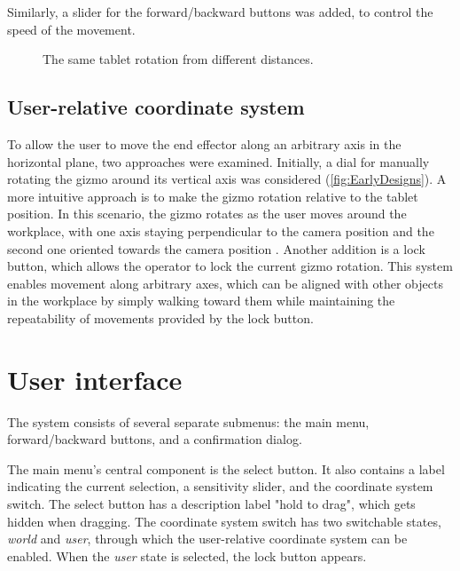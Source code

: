Similarly, a slider for the forward/backward buttons was added, to control the speed of the movement. 

\begin{figure}
    \centering
    \subfloat{
        
        \label{close}
    }
    \qquad
    \subfloat{
        
        \label{far}
    }
    
    \caption{The same tablet rotation from different distances.}
    \label{fig:closefar}
\end{figure}

\subsection{User-relative coordinate system}

To allow the user to move the end effector along an arbitrary axis in the horizontal plane, two approaches were examined. Initially, a dial for manually rotating the gizmo around its vertical axis was considered (\ref{fig:EarlyDesigns}). A more intuitive approach is to make the gizmo rotation relative to the tablet position. In this scenario, the gizmo rotates as the user moves around the workplace, with one axis staying perpendicular to the camera position and the second one oriented towards the camera position . Another addition is a lock button, which allows the operator to lock the current gizmo rotation. This system enables movement along arbitrary axes, which can be aligned with other objects in the workplace by simply walking toward them while maintaining the repeatability of movements provided by the lock button. 

\section{User interface}
The system consists of several separate submenus: the main menu, forward/backward buttons, and a confirmation dialog.

The main menu's central component is the select button. It also contains a label indicating the current selection, a sensitivity slider, and the coordinate system switch. The select button has a description label "hold to drag", which gets hidden when dragging. The coordinate system switch has two switchable states, \textit{world} and \textit{user}, through which the user-relative coordinate system can be enabled. When the \textit{user} state is selected, the lock button appears. 

